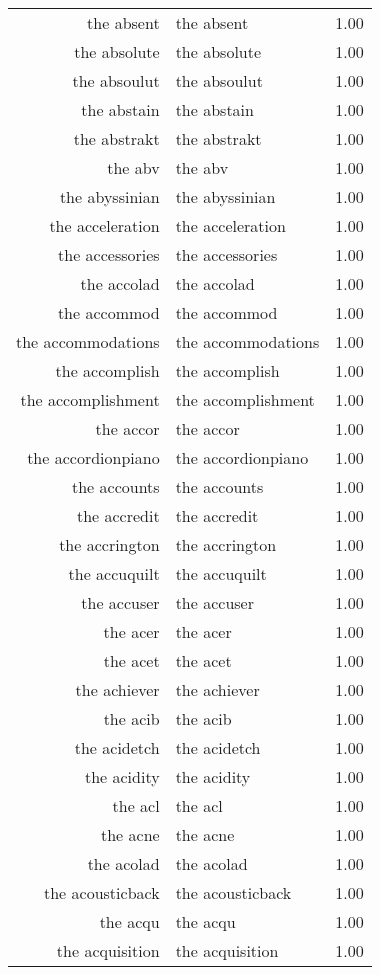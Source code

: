 \begin{table}[ht]
\begin{tabular}{rlr}
  the absent & the absent & 1.00 \\ 
  the absolute & the absolute & 1.00 \\ 
  the absoulut & the absoulut & 1.00 \\ 
  the abstain & the abstain & 1.00 \\ 
  the abstrakt & the abstrakt & 1.00 \\ 
  the abv & the abv & 1.00 \\ 
  the abyssinian & the abyssinian & 1.00 \\ 
  the acceleration & the acceleration & 1.00 \\ 
  the accessories & the accessories & 1.00 \\ 
  the accolad & the accolad & 1.00 \\ 
  the accommod & the accommod & 1.00 \\ 
  the accommodations & the accommodations & 1.00 \\ 
  the accomplish & the accomplish & 1.00 \\ 
  the accomplishment & the accomplishment & 1.00 \\ 
  the accor & the accor & 1.00 \\ 
  the accordionpiano & the accordionpiano & 1.00 \\ 
  the accounts & the accounts & 1.00 \\ 
  the accredit & the accredit & 1.00 \\ 
  the accrington & the accrington & 1.00 \\ 
  the accuquilt & the accuquilt & 1.00 \\ 
  the accuser & the accuser & 1.00 \\ 
  the acer & the acer & 1.00 \\ 
  the acet & the acet & 1.00 \\ 
  the achiever & the achiever & 1.00 \\ 
  the acib & the acib & 1.00 \\ 
  the acidetch & the acidetch & 1.00 \\ 
  the acidity & the acidity & 1.00 \\ 
  the acl & the acl & 1.00 \\ 
  the acne & the acne & 1.00 \\ 
  the acolad & the acolad & 1.00 \\ 
  the acousticback & the acousticback & 1.00 \\ 
  the acqu & the acqu & 1.00 \\ 
  the acquisition & the acquisition & 1.00 \\ 

\end{tabular}
\end{table}
